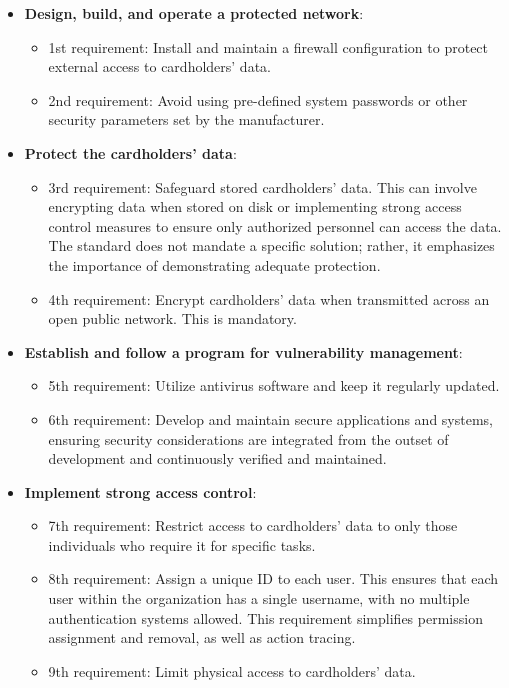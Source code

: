 \begin{itemize}
	\item \textbf{Design, build, and operate a protected network}:
	      \begin{itemize}
		      \item 1st requirement: Install and maintain a firewall configuration to protect external access to cardholders' data.
		      \item 2nd requirement: Avoid using pre-defined system passwords or other security parameters set by the manufacturer.
	      \end{itemize}

	\item \textbf{Protect the cardholders' data}:
	      \begin{itemize}
		      \item 3rd requirement: Safeguard stored cardholders' data. This can involve encrypting data when stored on disk or implementing strong access control measures to ensure only authorized personnel can access the data. The standard does not mandate a specific solution; rather, it emphasizes the importance of demonstrating adequate protection.
		      \item 4th requirement: Encrypt cardholders' data when transmitted across an open public network. This is mandatory.
	      \end{itemize}

	\item \textbf{Establish and follow a program for vulnerability management}:
	      \begin{itemize}
		      \item 5th requirement: Utilize antivirus software and keep it regularly updated.
		      \item 6th requirement: Develop and maintain secure applications and systems, ensuring security considerations are integrated from the outset of development and continuously verified and maintained.
	      \end{itemize}

	\item \textbf{Implement strong access control}:
	      \begin{itemize}
		      \item 7th requirement: Restrict access to cardholders' data to only those individuals who require it for specific tasks.
		      \item 8th requirement: Assign a unique ID to each user. This ensures that each user within the organization has a single username, with no multiple authentication systems allowed. This requirement simplifies permission assignment and removal, as well as action tracing.
		      \item 9th requirement: Limit physical access to cardholders' data.
	      \end{itemize}


\end{itemize}
